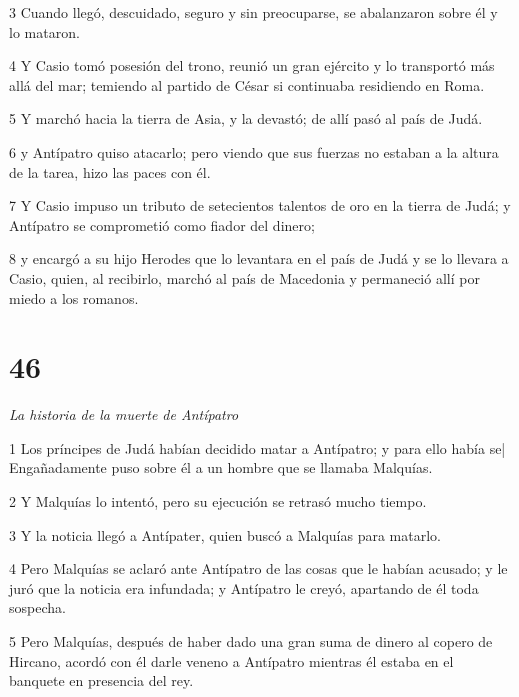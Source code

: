 \par 3 Cuando llegó, descuidado, seguro y sin preocuparse, se abalanzaron sobre él y lo mataron.

\par 4 Y Casio tomó posesión del trono, reunió un gran ejército y lo transportó más allá del mar; temiendo al partido de César si continuaba residiendo en Roma.

\par 5 Y marchó hacia la tierra de Asia, y la devastó; de allí pasó al país de Judá.

\par 6 y Antípatro quiso atacarlo; pero viendo que sus fuerzas no estaban a la altura de la tarea, hizo las paces con él.

\par 7 Y Casio impuso un tributo de setecientos talentos de oro en la tierra de Judá; y Antípatro se comprometió como fiador del dinero;

\par 8 y encargó a su hijo Herodes que lo levantara en el país de Judá y se lo llevara a Casio, quien, al recibirlo, marchó al país de Macedonia y permaneció allí por miedo a los romanos.

\chapter{46}

\par \textit{La historia de la muerte de Antípatro}

\par 1 Los príncipes de Judá habían decidido matar a Antípatro; y para ello había se| Engañadamente puso sobre él a un hombre que se llamaba Malquías.

\par 2 Y Malquías lo intentó, pero su ejecución se retrasó mucho tiempo.

\par 3 Y la noticia llegó a Antípater, quien buscó a Malquías para matarlo.

\par 4 Pero Malquías se aclaró ante Antípatro de las cosas que le habían acusado; y le juró que la noticia era infundada; y Antípatro le creyó, apartando de él toda sospecha.

\par 5 Pero Malquías, después de haber dado una gran suma de dinero al copero de Hircano, acordó con él darle veneno a Antípatro mientras él estaba en el banquete en presencia del rey.

